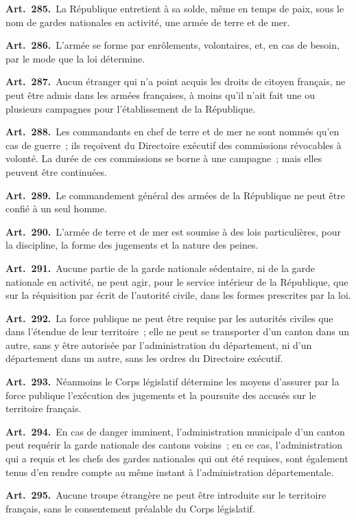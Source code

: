 \documentclass[french,twoside]{book} %
\newcommand{\labelchar}[1]{\textbf{\color{rubric} #1}}
\begin{document}
\labelchar{Art. 285.} La République entretient à sa solde, même en temps de paix, sous le nom de gardes nationales en activité, une armée de terre et de mer.\par
\labelchar{Art. 286.} L’armée se forme par enrôlements, volontaires, et, en cas de besoin, par le mode que la loi détermine.\par
\labelchar{Art. 287.} Aucun étranger qui n’a point acquis les droits de citoyen français, ne peut être admis dans les armées françaises, à moins qu’il n’ait fait une ou plusieurs campagnes pour l’établissement de la République.\par
\labelchar{Art. 288.} Les commandants en chef de terre et de mer ne sont nommés qu’en cas de guerre ; ils reçoivent du Directoire exécutif des commissions révocables à volonté. La durée de ces commissions se borne à une campagne ; mais elles peuvent être continuées.\par
\labelchar{Art. 289.} Le commandement général des armées de la République ne peut être confié à un seul homme.\par
\labelchar{Art. 290.} L’armée de terre et de mer est soumise à des lois particulières, pour la discipline, la forme des jugements et la nature des peines.\par
\labelchar{Art. 291.} Aucune partie de la garde nationale sédentaire, ni de la garde nationale en activité, ne peut agir, pour le service intérieur de la République, que sur la réquisition par écrit de l’autorité civile, dans les formes prescrites par la loi.\par
\labelchar{Art. 292.} La force publique ne peut être requise par les autorités civiles que dans l’étendue de leur territoire ; elle ne peut se transporter d’un canton dans un autre, sans y être autorisée par l’administration du département, ni d’un département dans un autre, sans les ordres du Directoire exécutif.\par
\labelchar{Art. 293.} Néanmoins le Corps législatif détermine les moyens d’assurer par la force publique l’exécution des jugements et la poursuite des accusés sur le territoire français.\par
\labelchar{Art. 294.} En cas de danger imminent, l’administration municipale d’un canton peut requérir la garde nationale des cantons voisins ; en ce cas, l’administration qui a requis et les chefs des gardes nationales qui ont été requises, sont également tenus d’en rendre compte au même instant à l’administration départementale.\par
\labelchar{Art. 295.} Aucune troupe étrangère ne peut être introduite sur le territoire français, sans le consentement préalable du Corps législatif.
\end{document}
